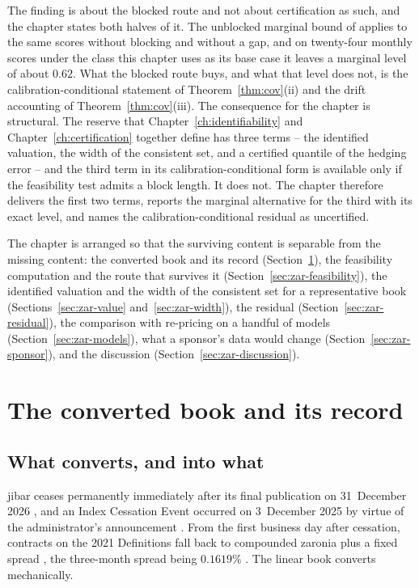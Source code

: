 \documentclass[../../../main.tex]{subfiles}
\begin{document}
The finding is about the blocked route and not about certification as such, and the chapter states both halves of it. The unblocked marginal bound of \citet[Cor.~1, eq.~(6)]{barber2026} applies to the same scores without blocking and without a gap, and on twenty-four monthly scores under the class this chapter uses as its base case it leaves a marginal level of about $0.62$. What the blocked route buys, and what that level does not, is the calibration-conditional statement of Theorem~\ref{thm:cov}(ii) and the drift accounting of Theorem~\ref{thm:cov}(iii). The consequence for the chapter is structural. The reserve that Chapter~\ref{ch:identifiability} and Chapter~\ref{ch:certification} together define has three terms -- the identified valuation, the width of the consistent set, and a certified quantile of the hedging error -- and the third term in its calibration-conditional form is available only if the feasibility test admits a block length. It does not. The chapter therefore delivers the first two terms, reports the marginal alternative for the third with its exact level, and names the calibration-conditional residual as uncertified.

The chapter is arranged so that the surviving content is separable from the missing content: the converted book and its record (Section~\ref{sec:zar-book}), the feasibility computation and the route that survives it (Section~\ref{sec:zar-feasibility}), the identified valuation and the width of the consistent set for a representative book (Sections~\ref{sec:zar-value} and~\ref{sec:zar-width}), the residual (Section~\ref{sec:zar-residual}), the comparison with re-pricing on a handful of models (Section~\ref{sec:zar-models}), what a sponsor's data would change (Section~\ref{sec:zar-sponsor}), and the discussion (Section~\ref{sec:zar-discussion}).

\section{The converted book and its record}\label{sec:zar-book}

\subsection{What converts, and into what}

\gls{jibar} ceases permanently immediately after its final publication on 31~December 2026 \citep[p.~1 and Sect.~1]{isda2025}, and an Index Cessation Event occurred on 3~December 2025 by virtue of the administrator's announcement \citep[Sect.~1.1]{isda2025}. From the first business day after cessation, contracts on the 2021 Definitions fall back to compounded \gls{zaronia} plus a fixed spread \citep[Sect.~3]{isda2025}, the three-month spread being $0.1619\%$ \citep[p.~1]{bisl2025}. The linear book converts mechanically.
\end{document}
